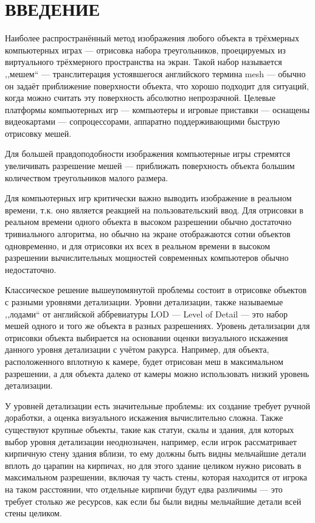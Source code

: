 \clearpage
\section{ВВЕДЕНИЕ}
Наиболее распространённый метод изображения любого объекта в трёхмерных компьютерных играх --- отрисовка набора треугольников, проецируемых из виртуального трёхмерного пространства на экран.
Такой набор называется ,,мешем`` --- транслитерация устоявшегося английского термина mesh --- обычно он задаёт приближение поверхности объекта, что хорошо подходит для ситуаций, когда можно считать эту поверхность абсолютно непрозрачной.
Целевые платформы компьютерных игр --- компьютеры и игровые приставки --- оснащены видеокартами --- сопроцессорами, аппаратно поддерживающими быструю отрисовку мешей.

Для большей правдоподобности изображения компьютерные игры стремятся увеличивать разрешение мешей --- приближать поверхность объекта большим количеством треугольников малого размера.

Для компьютерных игр критически важно выводить изображение в реальном времени, т.к. оно является реакцией на пользовательский ввод.
Для отрисовки в реальном времени одного объекта в высоком разрешении обычно достаточно тривиального алгоритма, но обычно на экране отображаются сотни объектов одновременно, и для отрисовки их всех в реальном времени в высоком разрешении вычислительных мощностей современных компьютеров обычно недостаточно.

Классическое решение вышеупомянутой проблемы состоит в отрисовке объектов с разными уровнями детализации.
Уровни детализации, также называемые ,,лодами`` от английской аббревиатуры LOD --- Level of Detail --- это набор мешей одного и того же объекта в разных разрешениях.
Уровень детализации для отрисовки объекта выбирается на основании оценки визуального искажения данного уровня детализации с учётом ракурса.
Например, для объекта, расположенного вплотную к камере, будет отрисован меш в максимальном разрешении, а для объекта далеко от камеры можно использовать низкий уровень детализации.

У уровней детализации есть значительные проблемы: их создание требует ручной доработки, а оценка визуального искажения вычислительно сложна.
Также существуют крупные объекты, такие как статуи, скалы и здания, для которых выбор уровня детализации неоднозначен, например, если игрок рассматривает кирпичную стену здания вблизи, то ему должны быть видны мельчайшие детали вплоть до царапин на кирпичах, но для этого здание целиком нужно рисовать в максимальном разрешении, включая ту часть стены, которая находится от игрока на таком расстоянии, что отдельные кирпичи будут едва различимы --- это требует столько же ресурсов, как если бы были видны мельчайшие детали всей стены целиком.

